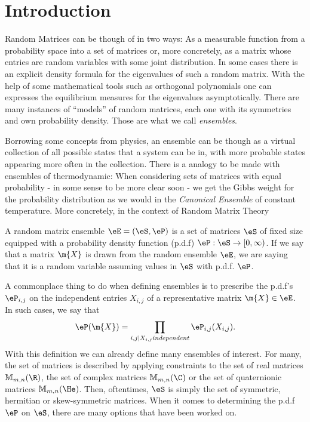 \section{Introduction}

Random Matrices can be though of in two ways: As a measurable function from a probability space into a set of matrices or, more concretely, as a matrix whose entries are random variables with some joint distribution. In some cases there is an explicit density formula for the eigenvalues of such a random matrix. With the help of some mathematical tools such as orthogonal polynomials one can expresses the equilibrium measures for the eigenvalues asymptotically.  There are many instances of \enquote{models} of random matrices, each one with its symmetries and own probability density. Those are what we call \textit{ensembles}. 

Borrowing some concepts from physics, an ensemble can be though as a virtual collection of all possible states that a system can be in, with more probable states appearing more often in the collection. There is a analogy to be made with ensembles of thermodynamic: When considering sets of matrices with equal probability - in some sense to be more clear soon - we get the Gibbs weight for the probability distribution as we would in the \textit{Canonical Ensemble} of constant temperature. More concretely, in the context of Random Matrix Theory

\begin{definition}
	A random matrix ensemble $\eE = (\eS, \eP)$ is a set of matrices $\eS$ of fixed size equipped with a probability density function (p.d.f) $\eP: \eS \rightarrow [0, \infty)$. If we say that a matrix $\m{X}$ is drawn from the random ensemble $\eE$, we are saying that it is a random variable assuming values in $\eS$ with p.d.f. $\eP$.
	\label{Def: Ensemble}
\end{definition}

A commonplace thing to do when defining ensembles is to prescribe the p.d.f's $\eP_{i,j}$ on the independent entries $X_{i,j}$ of a representative matrix $\m{X} \in \eE$. In such cases, we say that
\begin{equation}
	\eP(\m{X}) = \prod_{i,j | X_{i,j} independent} \eP_{i,j}(X_{i,j}).
\end{equation}
With this definition we can already define many ensembles of interest. For many, the set of matrices is described by applying constraints to the set of real matrices $\mathbb{M}_{m,n}(\R)$, the set of complex matrices $\mathbb{M}_{m,n}(\C)$ or the set of quaternionic matrices $\mathbb{M}_{m,n}(\He)$. Then, oftentimes, $\eS$ is simply the set of symmetric, hermitian or skew-symmetric matrices. When it comes to determining the p.d.f $\eP$ on $\eS$, there are many options that have been worked on.

